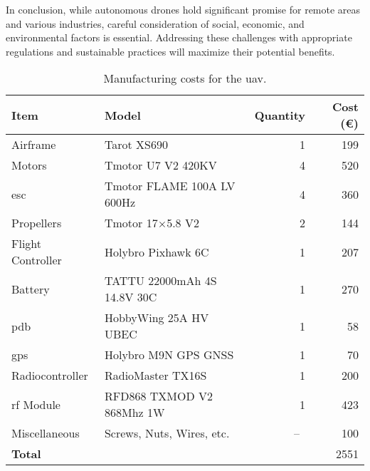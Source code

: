 In conclusion, while autonomous drones hold significant promise for remote areas and various industries, careful consideration of social, economic, and environmental factors is essential. Addressing these challenges with appropriate regulations and sustainable practices will maximize their potential benefits.

\begin{table}[H]
  \begin{tabular}{ l l r r }
    \toprule
    \textbf{Item} & \textbf{Model} & \textbf{Quantity} & \textbf{Cost (\euro)} \\
    \midrule
    Airframe & Tarot XS690 \autocite{rcinnovationsQuadPlegable} & 1 & 199 \\
    Motors & Tmotor U7 V2 420KV \autocite{rcinnovationsTmotor420KV} & 4 & 520 \\
    \gls{esc} & Tmotor FLAME 100A LV 600Hz \autocite{rcinnovationsVariadorTmotor} & 4 & 360 \\
    Propellers & Tmotor 17$\times$5.8 V2 \autocite{rcinnovationsTmotor17x58} & 2 & 144 \\
    Flight Controller & Holybro Pixhawk 6C \autocite{rcinnovationsPixhawkCarcasa} & 1 & 207 \\
    Battery & TATTU 22000mAh 4S 14.8V 30C \autocite{rcinnovationsComprarBatera}  & 1 & 270 \\
    \gls{pdb} & HobbyWing 25A HV UBEC \autocite{rcinnovationsHobbyWingUbec} & 1 & 58 \\
    \gls{gps} & Holybro M9N GPS GNSS \autocite{rcinnovationsHolybroGNSS} & 1 & 70 \\
    Radiocontroller & RadioMaster TX16S \autocite{rcinnovationsRadioMasterTX16S} & 1 & 200 \\
    \gls{rf} Module & RFD868 TXMOD V2 868Mhz 1W \autocite{rcinnovationsComprarMdulos} & 1 & 423 \\
    Miscellaneous & Screws, Nuts, Wires, etc. &~--~& 100 \\
    \midrule
    \textbf{Total} & & & 2551 \\
    \bottomrule
  \end{tabular}
  \caption{Manufacturing costs for the \gls{uav}.}\label{tab:manufacturing_costs_uav}
\end{table}

